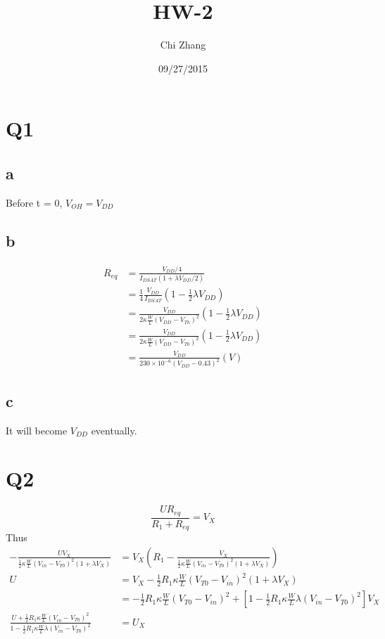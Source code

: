 \documentclass[a4paper,10pt]{article}
\title{HW-2}
\author{Chi Zhang}
\date{09/27/2015}
\begin{document}
\maketitle
\section*{Q1}
\subsection*{a}
Before t = 0, \begin{math}V_{OH} = V_{DD}\end{math}
\subsection*{b}
\begin{equation}
 \begin{split}
  R_{eq} &= \frac{V_{DD} / 4}{I_{DSAT}(1 + \lambda V_{DD} / 2)}\\
         &=\frac{1}{4} \frac{V_{DD}}{I_{DSAT}} ( 1 - \frac{1}{2}\lambda V_{DD} )\\
         &= \frac{V_{DD}}{2\kappa\frac{W}{L}(V_{DD} - V_{Th})^2} ( 1 - \frac{1}{2}\lambda V_{DD} )\\
         &= \frac{V_{DD}}{2\kappa\frac{W}{L}(V_{DD} - V_{T0})^2} ( 1 - \frac{1}{2}\lambda V_{DD} )\\
         &= \frac{V_{DD}}{230\times 10^{-6}(V_{DD} - 0.43)^2} (V)
 \end{split}
\end{equation}
\subsection*{c}
It will become \begin{math}V_{DD}\end{math} eventually.
\section*{Q2}
\begin{equation}
\frac{UR_{eq}}{R_1 + R_{eq}} = V_X
\end{equation}
Thus
\begin{equation}
\begin{split}
 -\frac{UV_X}{\frac{1}{2}\kappa\frac{W}{L}(V_{in} - V_{T0})^2 (1+\lambda V_X)} &= V_X \left( R_1 - \frac{V_X}{\frac{1}{2}\kappa\frac{W}{L}(V_{in} - V_{T0})^2 (1+\lambda V_X)}\right)\\
 U &= V_X - \frac{1}{2}R_1 \kappa\frac{W}{L}(V_{T0} - V_{in})^2(1+\lambda V_X)\\
 &= -\frac{1}{2}R_1 \kappa\frac{W}{L}(V_{T0} - V_{in})^2 + \left[1 - \frac{1}{2}R_1 \kappa\frac{W}{L}\lambda(V_{in} - V_{T0})^2 \right] V_X\\
 \frac{U+\frac{1}{2}R_1 \kappa\frac{W}{L} (V_{in} - V_{T0})^2}{1 - \frac{1}{2}R_1 \kappa\frac{W}{L} \lambda (V_{in} - V_{T0})^2} &= U_X
\end{split}
\end{equation}
\end{document}
